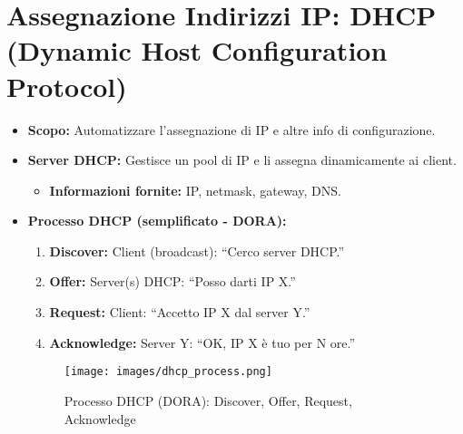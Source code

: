 \section{Assegnazione Indirizzi IP: DHCP (Dynamic Host Configuration Protocol)}
\begin{itemize}
    \item \textbf{Scopo:} Automatizzare l'assegnazione di IP e altre info di configurazione.
    \item \textbf{Server DHCP:} Gestisce un pool di IP e li assegna dinamicamente ai client.
    \begin{itemize}
        \item \textbf{Informazioni fornite:} IP, netmask, gateway, DNS.
    \end{itemize}
    \item \textbf{Processo DHCP (semplificato - DORA):}
    \begin{enumerate}
        \item \textbf{Discover:} Client (broadcast): ``Cerco server DHCP.''
        \item \textbf{Offer:} Server(s) DHCP: ``Posso darti IP X.''
        \item \textbf{Request:} Client: ``Accetto IP X dal server Y.''
        \item \textbf{Acknowledge:} Server Y: ``OK, IP X è tuo per N ore.''
    \end{enumerate}
    
    \begin{figure}[H]
        \centering
        \texttt{[image: images/dhcp\_process.png]}
        \caption{Processo DHCP (DORA): Discover, Offer, Request, Acknowledge}
    \end{figure}
    

\end{itemize}
